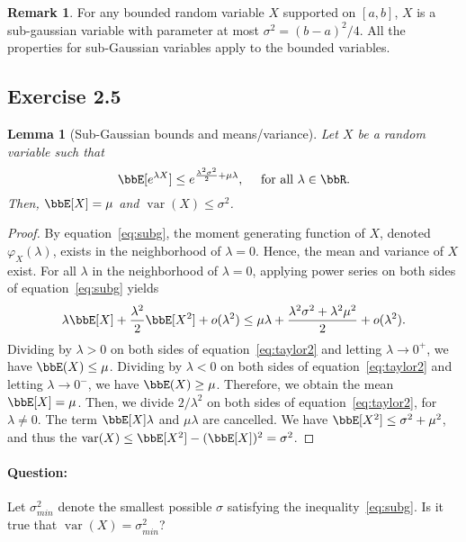 \documentclass[11pt]{article}
\DeclareMathOperator{\var}{var}
\theoremstyle{plain}
\newtheorem{lem}{Lemma}
\theoremstyle{definition}
\newtheorem{rmk}{Remark}
\begin{document}
\begin{rmk}
	For any bounded random variable $X$ supported on $[a,b]$, $X$ is a sub-gaussian variable with parameter at most $\sigma^2 = (b-a)^2/4$. All the properties for sub-Gaussian variables apply to the bounded variables. 
\end{rmk}


\subsection{Exercise 2.5}
\begin{lem}[Sub-Gaussian bounds and means/variance] Let $X$ be a random variable  such that
\begin{equation}\label{eq:subg}
	 \bbE[e^{\lambda X}] \leq e^{\frac{\lambda^2 \sigma^2}{2} + \mu \lambda}, \quad \text{ for all } \lambda \in \bbR. 
\end{equation}
	Then, $\bbE[X] = \mu$ and $\var(X) \leq \sigma^2$.
\end{lem}

\begin{proof} By equation~\eqref{eq:subg}, the moment generating function of $X$, denoted $\varphi_X(\lambda)$, exists in the neighborhood of $\lambda = 0$.  Hence, the mean and variance of $X$ exist. For all $\lambda$ in the neighborhood of $\lambda = 0$, applying power series on both sides of equation~\eqref{eq:subg} yields 
\begin{equation}\label{eq:taylor2}
	 \lambda \bbE[X] + \frac{\lambda^2}{2} \bbE[X^2] + o(\lambda^2) \leq  \mu \lambda + \frac{\lambda^2 \sigma^2 + \lambda^2 \mu^2}{2} + o(\lambda^2). 
\end{equation}
Dividing by $\lambda >0$ on both sides of equation~\eqref{eq:taylor2} and letting $\lambda \rightarrow 0^{+}$, we have $\bbE(X) \leq \mu$. Dividing by $\lambda <0$ on both sides of equation~\eqref{eq:taylor2} and letting $\lambda \rightarrow 0^{-}$, we have $\bbE(X) \geq \mu$. Therefore, we obtain the mean $\bbE[X] = \mu$. Then, we divide ${2}/{\lambda^2}$ on both sides of equation~\eqref{eq:taylor2}, for $\lambda \neq 0$. The term $\bbE[X]\lambda$ and  $\mu \lambda$ are cancelled. We have $ \bbE[X^2] \leq \sigma^2 + \mu^2$, and thus the $\var(X) \leq \bbE[X^2]  - (\bbE[X])^2 = \sigma^2$.
\end{proof}

\paragraph{Question:} Let $\sigma^2_{min}$ denote the smallest possible $\sigma$ satisfying the inequality~\eqref{eq:subg}. Is it true that $\var(X) = \sigma_{min}^2$?
\end{document}
